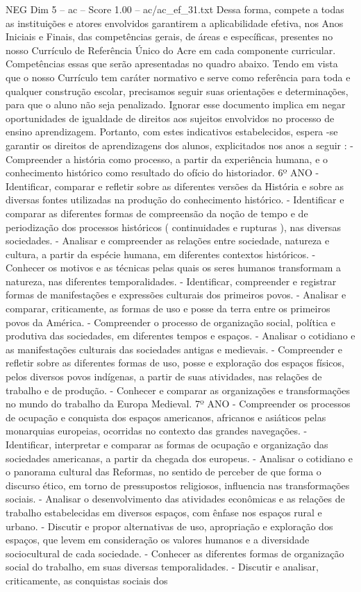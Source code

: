 \begin{textsample}{NEG Dim 5 – ac – Score 1.00 – ac/ac\_ef\_31.txt}
Dessa forma, compete a todas as instituições e atores envolvidos garantirem a aplicabilidade efetiva, nos Anos Iniciais e Finais, das competências gerais, de áreas e específicas, presentes no nosso Currículo de Referência Único do Acre em cada componente curricular.
Competências essas que serão apresentadas no quadro abaixo.
Tendo em vista que o nosso Currículo tem caráter normativo e serve como referência para toda e qualquer construção escolar, precisamos seguir suas orientações e determinações, para que o aluno não seja penalizado.
Ignorar esse documento implica em negar oportunidades de igualdade de direitos aos sujeitos envolvidos no processo de ensino aprendizagem.
Portanto, com estes indicativos estabelecidos, espera -se garantir os direitos de aprendizagens dos alunos, explicitados nos anos a seguir : - Compreender a história como processo, a partir da experiência humana, e o conhecimento histórico como resultado do ofício do historiador. 6º ANO - Identificar, comparar e refletir sobre as diferentes versões da História e sobre as diversas fontes utilizadas na produção do conhecimento histórico. - Identificar e comparar as diferentes formas de compreensão da noção de tempo e de periodização dos processos históricos ( continuidades e rupturas ), nas diversas sociedades. - Analisar e compreender as relações entre sociedade, natureza e cultura, a partir da espécie humana, em diferentes contextos históricos. - Conhecer os motivos e as técnicas pelas quais os seres humanos transformam a natureza, nas diferentes temporalidades. - Identificar, compreender e registrar formas de manifestações e expressões culturais dos primeiros povos. - Analisar e comparar, criticamente, as formas de uso e posse da terra entre os primeiros povos da América. - Compreender o processo de organização social, política e produtiva das sociedades, em diferentes tempos e espaços. - Analisar o cotidiano e as manifestações culturais das sociedades antigas e medievais. - Compreender e refletir sobre as diferentes formas de uso, posse e exploração dos espaços físicos, pelos diversos povos indígenas, a partir de suas atividades, nas relações de trabalho e de produção. - Conhecer e comparar as organizações e transformações no mundo do trabalho da Europa Medieval. 7º ANO - Compreender os processos de ocupação e conquista dos espaços americanos, africanos e asiáticos pelas monarquias europeias, ocorridas no contexto das grandes navegações. - Identificar, interpretar e comparar as formas de ocupação e organização das sociedades americanas, a partir da chegada dos europeus. - Analisar o cotidiano e o panorama cultural das Reformas, no sentido de perceber de que forma o discurso ético, em torno de pressupostos religiosos, influencia nas transformações sociais. - Analisar o desenvolvimento das atividades econômicas e as relações de trabalho estabelecidas em diversos espaços, com ênfase nos espaços rural e urbano. - Discutir e propor alternativas de uso, apropriação e exploração dos espaços, que levem em consideração os valores humanos e a diversidade sociocultural de cada sociedade. - Conhecer as diferentes formas de organização social do trabalho, em suas diversas temporalidades. - Discutir e analisar, criticamente, as conquistas sociais dos 
\end{textsample}
